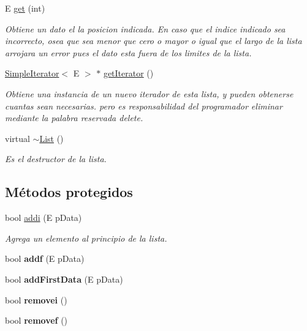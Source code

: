 \begin{DoxyCompactItemize}
E \hyperlink{classList_ab081a52d7a62aa6c5550ff9762f9427f}{get} (int)
\begin{DoxyCompactList}\small\item\em Obtiene un dato el la posicion indicada. En caso que el indice indicado sea incorrecto, osea que sea menor que cero o mayor o igual que el largo de la lista arrojara un error pues el dato esta fuera de los limites de la lista. \end{DoxyCompactList}\item 
\hyperlink{classSimpleIterator}{Simple\-Iterator}$<$ E $>$ $\ast$ \hyperlink{classList_accb5fe71cb60ba7bf0ccab362b1f87cb}{get\-Iterator} ()
\begin{DoxyCompactList}\small\item\em Obtiene una instancia de un nuevo iterador de esta lista, y pueden obtenerse cuantas sean necesarias. pero es responsabilidad del programador eliminar mediante la palabra reservada delete. \end{DoxyCompactList}\item 
\hypertarget{classList_a0af4c4d8a3d0710e58b12db35f9b0a3d}{virtual \hyperlink{classList_a0af4c4d8a3d0710e58b12db35f9b0a3d}{$\sim$\-List} ()}\label{classList_a0af4c4d8a3d0710e58b12db35f9b0a3d}

\begin{DoxyCompactList}\small\item\em Es el destructor de la lista. \end{DoxyCompactList}\end{DoxyCompactItemize}
\subsection*{Métodos protegidos}
\begin{DoxyCompactItemize}
\item 
bool \hyperlink{classList_a92ad933f8d3a033b84a517fb6cc4111a}{addi} (E p\-Data)
\begin{DoxyCompactList}\small\item\em Agrega un elemento al principio de la lista. \end{DoxyCompactList}\item 
\hypertarget{classList_a3c920f9c86d2853121c5cd2fb46f8436}{bool {\bfseries addf} (E p\-Data)}\label{classList_a3c920f9c86d2853121c5cd2fb46f8436}

\item 
\hypertarget{classList_ac38635d10f3faaf49af53c0b66347d0f}{bool {\bfseries add\-First\-Data} (E p\-Data)}\label{classList_ac38635d10f3faaf49af53c0b66347d0f}

\item 
\hypertarget{classList_a1d0a5649ddd83cb781174698f80b2e0f}{bool {\bfseries removei} ()}\label{classList_a1d0a5649ddd83cb781174698f80b2e0f}

\item 
\hypertarget{classList_a45231b54bf8c98948becddd0923be138}{bool {\bfseries removef} ()}\label{classList_a45231b54bf8c98948becddd0923be138}

\end{DoxyCompactItemize}
